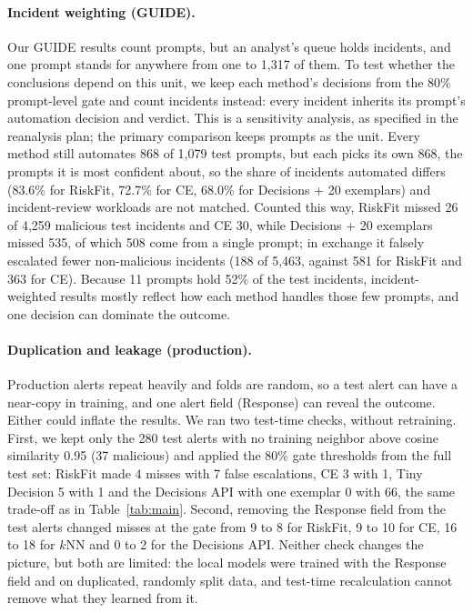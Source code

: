 \documentclass[letterpaper]{article} %
\begin{document}
\paragraph{Incident weighting (GUIDE).} Our GUIDE results count prompts, but an analyst's queue holds incidents, and one prompt stands for anywhere from one to 1,317 of them. To test whether the conclusions depend on this unit, we keep each method's decisions from the 80\% prompt-level gate and count incidents instead: every incident inherits its prompt's automation decision and verdict. This is a sensitivity analysis, as specified in the reanalysis plan; the primary comparison keeps prompts as the unit. Every method still automates 868 of 1,079 test prompts, but each picks its own 868, the prompts it is most confident about, so the share of incidents automated differs (83.6\% for RiskFit, 72.7\% for CE, 68.0\% for Decisions + 20 exemplars) and incident-review workloads are not matched. Counted this way, RiskFit missed 26 of 4,259 malicious test incidents and CE 30, while Decisions + 20 exemplars missed 535, of which 508 come from a single prompt; in exchange it falsely escalated fewer non-malicious incidents (188 of 5,463, against 581 for RiskFit and 363 for CE). Because 11 prompts hold 52\% of the test incidents, incident-weighted results mostly reflect how each method handles those few prompts, and one decision can dominate the outcome.

\paragraph{Duplication and leakage (production).} Production alerts repeat heavily and folds are random, so a test alert can have a near-copy in training, and one alert field (Response) can reveal the outcome. Either could inflate the results. We ran two test-time checks, without retraining. First, we kept only the 280 test alerts with no training neighbor above cosine similarity 0.95 (37 malicious) and applied the 80\% gate thresholds from the full test set: RiskFit made 4 misses with 7 false escalations, CE 3 with 1, Tiny Decision 5 with 1 and the Decisions API with one exemplar 0 with 66, the same trade-off as in Table~\ref{tab:main}. Second, removing the Response field from the test alerts changed misses at the gate from 9 to 8 for RiskFit, 9 to 10 for CE, 16 to 18 for $k$NN and 0 to 2 for the Decisions API. Neither check changes the picture, but both are limited: the local models were trained with the Response field and on duplicated, randomly split data, and test-time recalculation cannot remove what they learned from it.
\end{document}
